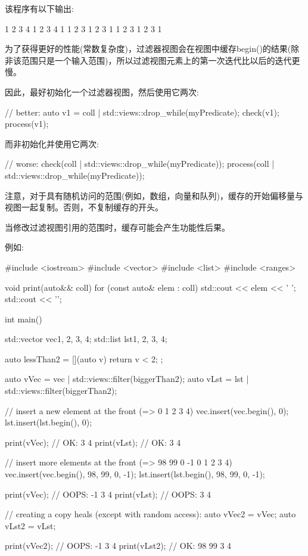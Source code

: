 该程序有以下输出:

\begin{shell}
1 2 3 4 1 2 3 4 1
1 2 3 1 2 3 1
1 2 3 1 2 3 1
\end{shell}


为了获得更好的性能(常数复杂度)，过滤器视图会在视图中缓存begin()的结果(除非该范围只是一个输入范围)，所以过滤视图元素上的第一次迭代比以后的迭代更慢。

因此，最好初始化一个过滤器视图，然后使用它两次:

\begin{cpp}
// better:
auto v1 = coll | std::views::drop_while(myPredicate);
check(v1);
process(v1);
\end{cpp}

而非初始化并使用它两次:

\begin{cpp}
// worse:
check(coll | std::views::drop_while(myPredicate));
process(coll | std::views::drop_while(myPredicate));
\end{cpp}

注意，对于具有随机访问的范围(例如，数组，向量和队列)，缓存的开始偏移量与视图一起复制。否则，不复制缓存的开头。

当修改过滤视图引用的范围时，缓存可能会产生功能性后果。

例如:


\begin{cpp}
#include <iostream>
#include <vector>
#include <list>
#include <ranges>

void print(auto&& coll)
{
	for (const auto& elem : coll) {
		std::cout << elem << ' ';
	}
	std::cout << '\n';
}

int main()
{
	std::vector vec{1, 2, 3, 4};
	std::list lst{1, 2, 3, 4};
	
	auto lessThan2 = [](auto v){
		return v < 2;
	};
	
	auto vVec = vec | std::views::filter(biggerThan2);
	auto vLst = lst | std::views::filter(biggerThan2);
	
	// insert a new element at the front (=> 0 1 2 3 4)
	vec.insert(vec.begin(), 0);
	lst.insert(lst.begin(), 0);
	
	print(vVec); // OK: 3 4
	print(vLst); // OK: 3 4
	
	// insert more elements at the front (=> 98 99 0 -1 0 1 2 3 4)
	vec.insert(vec.begin(), {98, 99, 0, -1});
	lst.insert(lst.begin(), {98, 99, 0, -1});
	
	print(vVec); // OOPS: -1 3 4
	print(vLst); // OOPS: 3 4
	
	// creating a copy heals (except with random access):
	auto vVec2 = vVec;
	auto vLst2 = vLst;
	
	print(vVec2); // OOPS: -1 3 4
	print(vLst2); // OK: 98 99 3 4
}
\end{cpp}

